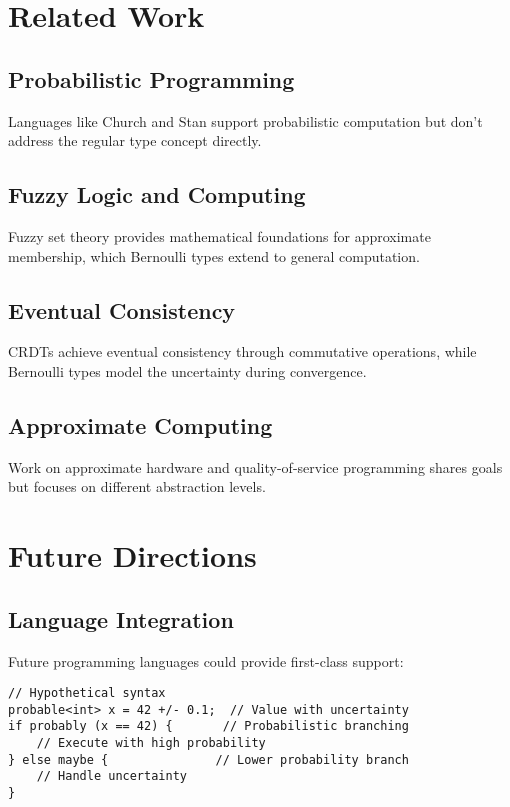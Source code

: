 \documentclass[11pt,final,hidelinks]{article}
\begin{document}
\section{Related Work}

\subsection{Probabilistic Programming}

Languages like Church \cite{goodman2008} and Stan \cite{carpenter2017} support probabilistic computation but don't address the regular type concept directly.

\subsection{Fuzzy Logic and Computing}

Fuzzy set theory \cite{zadeh1965} provides mathematical foundations for approximate membership, which Bernoulli types extend to general computation.

\subsection{Eventual Consistency}

CRDTs \cite{shapiro2011} achieve eventual consistency through commutative operations, while Bernoulli types model the uncertainty during convergence.

\subsection{Approximate Computing}

Work on approximate hardware \cite{han2013} and quality-of-service programming \cite{hoffmann2011} shares goals but focuses on different abstraction levels.

\section{Future Directions}

\subsection{Language Integration}

Future programming languages could provide first-class support:

\begin{verbatim}
// Hypothetical syntax
probable<int> x = 42 +/- 0.1;  // Value with uncertainty
if probably (x == 42) {       // Probabilistic branching
    // Execute with high probability
} else maybe {               // Lower probability branch
    // Handle uncertainty
}
\end{verbatim}
\end{document}
